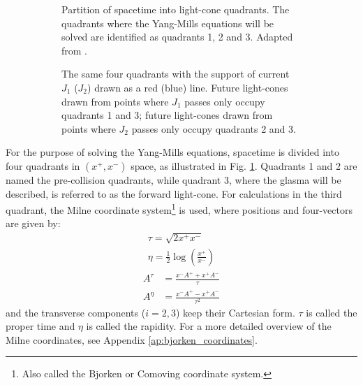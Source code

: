\begin{figure}
\centering
	\begin{subfigure}{0.4\textwidth}
	\centering
	
	\caption{Partition of spacetime into light-cone quadrants. The quadrants where the Yang-Mills equations will be solved are identified as quadrants 1, 2 and 3. Adapted from \citep{Kovner_1995}.}
	\label{fig:space_partition}
	\end{subfigure}
	\hfill
	\begin{subfigure}{0.55\textwidth}
	\centering
	
	\caption{The same four quadrants with the support of current $J_1$ ($J_2$) drawn as a red (blue) line. Future light-cones drawn from points where $J_1$ passes only occupy quadrants 1 and 3; future light-cones drawn from points where $J_2$ passes only occupy quadrants 2 and 3.}
	\label{fig:current_light-cones}
	\end{subfigure}
	\caption{}
\end{figure}

For the purpose of solving the Yang-Mills equations, spacetime is divided into four quadrants in $(x^+,x^-)$ space,  as illustrated in Fig. \ref{fig:space_partition}. Quadrants 1 and 2 are named the pre-collision quadrants, while quadrant 3, where the glasma will be described, is referred to as the forward light-cone. For calculations in the third quadrant, the Milne coordinate system\footnote{Also called the Bjorken or Comoving coordinate system.} is used, where positions and four-vectors are given by:
\begin{subequations}
\begin{gather}
	\tau = \sqrt{2x^+x^-} \\
	\eta = \frac{1}{2} \log \left( \frac{x^+}{x^-} \right)
\end{gather}
\end{subequations}
\begin{subequations}
\begin{align}
A^\tau & = \frac{x^- A^+ + x^+ A^-}{\tau} \\
A^\eta & = \frac{x^- A^+ - x^+ A^-}{\tau^2} \label{eq:milne_Aeta}
\end{align}
\end{subequations}
and the transverse components ($i=2,3$) keep their Cartesian form. $\tau$ is called the proper time and $\eta$ is called the rapidity. For a more detailed overview of the Milne coordinates, see Appendix \ref{ap:bjorken_coordinates}.

